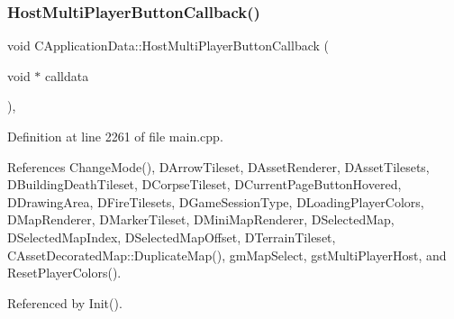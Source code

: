 \hypertarget{classCApplicationData_a9f804f7f34e1f0abf8c395cd0032d811}{}\label{classCApplicationData_a9f804f7f34e1f0abf8c395cd0032d811} 
\subsubsection{\texorpdfstring{Host\+Multi\+Player\+Button\+Callback()}{HostMultiPlayerButtonCallback()}}
{\footnotesize\ttfamily void C\+Application\+Data\+::\+Host\+Multi\+Player\+Button\+Callback (\begin{DoxyParamCaption}\item[{void $\ast$}]{calldata }\end{DoxyParamCaption})\hspace{0.3cm}{\ttfamily [static]}, {\ttfamily [protected]}}



Definition at line 2261 of file main.\+cpp.



References Change\+Mode(), D\+Arrow\+Tileset, D\+Asset\+Renderer, D\+Asset\+Tilesets, D\+Building\+Death\+Tileset, D\+Corpse\+Tileset, D\+Current\+Page\+Button\+Hovered, D\+Drawing\+Area, D\+Fire\+Tilesets, D\+Game\+Session\+Type, D\+Loading\+Player\+Colors, D\+Map\+Renderer, D\+Marker\+Tileset, D\+Mini\+Map\+Renderer, D\+Selected\+Map, D\+Selected\+Map\+Index, D\+Selected\+Map\+Offset, D\+Terrain\+Tileset, C\+Asset\+Decorated\+Map\+::\+Duplicate\+Map(), gm\+Map\+Select, gst\+Multi\+Player\+Host, and Reset\+Player\+Colors().



Referenced by Init().


